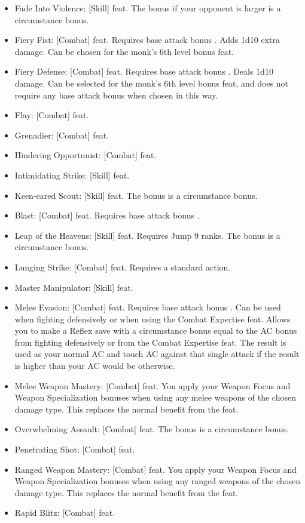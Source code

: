 \begin{itemize}
\item Fade Into Violence: [Skill] feat. The bonus if your opponent is larger is a circumstance bonus.
\item Fiery Fist: [Combat] feat. Requires base attack bonus . Adds 1d10 extra damage. Can be chosen for the monk's 6th level bonus feat.
\item Fiery \Ki Defense: [Combat] feat. Requires base attack bonus . Deals 1d10 damage. Can be selected for the monk's 6th level bonus feat, and does not require any base attack bonus when chosen in this way.
\item Flay: [Combat] feat.
\item Grenadier: [Combat] feat.
\item Hindering Opportunist: [Combat] feat.
\item Intimidating Strike: [Skill] feat.
\item Keen-eared Scout: [Skill] feat. The bonus is a circumstance bonus.
\item \Ki Blast: [Combat] feat. Requires base attack bonus . 
\item Leap of the Heavens: [Skill] feat. Requires Jump 9 ranks. The bonus is a circumstance bonus.
\item Lunging Strike: [Combat] feat. Requires a standard action.
\item Master Manipulator: [Skill] feat.
\item Melee Evasion: [Combat] feat. Requires base attack bonus . Can be used when fighting defensively or when using the Combat Expertise feat. Allows you to make a Reflex save with a circumstance bonus equal to the AC bonus from fighting defensively or from the Combat Expertise feat. The result is used as your normal AC and touch AC against that single attack if the result is higher than your AC would be otherwise.
\item Melee Weapon Mastery: [Combat] feat. You apply your Weapon Focus and Weapon Specialization bonuses when using any melee weapons of the chosen damage type. This replaces the normal benefit from the feat.
\item Overwhelming Assault: [Combat] feat. The bonus is a circumstance bonus.
\item Penetrating Shot: [Combat] feat.
\item Ranged Weapon Mastery: [Combat] feat. You apply your Weapon Focus and Weapon Specialization bonuses when using any ranged weapons of the chosen damage type. This replaces the normal benefit from the feat.
\item Rapid Blitz: [Combat] feat.

\end{itemize}
